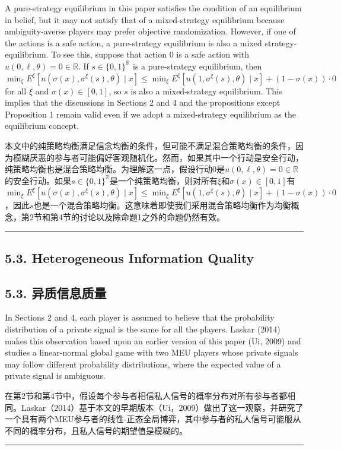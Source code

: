 \documentclass[12pt,a4paper]{article}
\newenvironment{original}
  {\par\medskip\noindent\color{black}\ignorespaces}
  {\par\medskip}
\newenvironment{translation}
  {\par\noindent\color{darkblue}\ignorespaces}
  {\par\medskip\noindent\hrule\par\medskip}
\theoremstyle{definition}
\theoremstyle{remark}
\begin{document}
\begin{original}
A pure-strategy equilibrium in this paper satisfies the condition of an equilibrium in belief, but it may not satisfy that of a mixed-strategy equilibrium because ambiguity-averse players may prefer objective randomization. However, if one of the actions is a safe action, a pure-strategy equilibrium is also a mixed strategy-equilibrium. To see this, suppose that action 0 is a safe action with $u(0, \ell, \theta) = 0 \in \mathbb{R}$. If $s \in \{0, 1\}^{\mathbb{R}}$ is a pure-strategy equilibrium, then $\min_{\xi} E^\xi[u(\sigma(x), \sigma^\xi(s), \theta) \mid x] \le \min_{\xi} E^\xi[u(1, \sigma^\xi(s), \theta) \mid x] + (1 - \sigma(x)) \cdot 0$ for all $\xi$ and $\sigma(x) \in [0, 1]$, so $s$ is also a mixed-strategy equilibrium. This implies that the discussions in Sections 2 and 4 and the propositions except Proposition 1 remain valid even if we adopt a mixed-strategy equilibrium as the equilibrium concept.
\end{original}
\begin{translation}
本文中的纯策略均衡满足信念均衡的条件，但可能不满足混合策略均衡的条件，因为模糊厌恶的参与者可能偏好客观随机化。然而，如果其中一个行动是安全行动，纯策略均衡也是混合策略均衡。为理解这一点，假设行动0是$u(0, \ell, \theta) = 0 \in \mathbb{R}$的安全行动。如果$s \in \{0, 1\}^{\mathbb{R}}$是一个纯策略均衡，则对所有$\xi$和$\sigma(x) \in [0, 1]$有$\min_{\xi} E^\xi[u(\sigma(x), \sigma^\xi(s), \theta) \mid x] \le \min_{\xi} E^\xi[u(1, \sigma^\xi(s), \theta) \mid x] + (1 - \sigma(x)) \cdot 0$，因此$s$也是一个混合策略均衡。这意味着即使我们采用混合策略均衡作为均衡概念，第2节和第4节的讨论以及除命题1之外的命题仍然有效。
\end{translation}

\subsection{5.3. Heterogeneous Information Quality}
\subsection*{\color{darkblue}5.3. 异质信息质量}

\begin{original}
In Sections 2 and 4, each player is assumed to believe that the probability distribution of a private signal is the same for all the players. Laskar (2014) makes this observation based upon an earlier version of this paper (Ui, 2009) and studies a linear-normal global game with two MEU players whose private signals may follow different probability distributions, where the expected value of a private signal is ambiguous.
\end{original}
\begin{translation}
在第2节和第4节中，假设每个参与者相信私人信号的概率分布对所有参与者都相同。Laskar（2014）基于本文的早期版本（Ui，2009）做出了这一观察，并研究了一个具有两个MEU参与者的线性-正态全局博弈，其中参与者的私人信号可能服从不同的概率分布，且私人信号的期望值是模糊的。
\end{translation}
\end{document}
